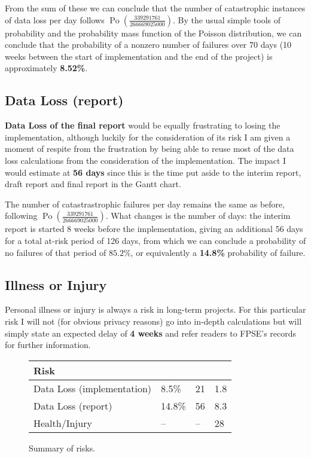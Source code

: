 From the sum of these we can conclude that the number of catastrophic
instances of data loss per day follows $\operatorname{Po}(\frac{339291761}
{266669025000})$. By the usual simple tools of probability and the
probability mass function of the Poisson distribution, we can
conclude that the probability of a nonzero number of failures over
70 days (10 weeks between the start of implementation and the end
of the project) is approximately \textbf{8.52\%}.

\subsection{Data Loss (report)}

\textbf{Data Loss of the final report} would be equally frustrating to
losing the implementation, although luckily for the consideration of its
risk I am given a moment of respite from the frustration by being able to
reuse most of the data loss calculations from the consideration of the
implementation. The impact I would estimate at \textbf{56 days} since this
is the time put aside to the interim report, draft report and final report
in the Gantt chart.

The number of catastrastrophic failures per day remains the same as before,
following $\operatorname{Po}(\frac{339291761}{266669025000})$. What changes
is the number of days: the interim report is started 8 weeks before the
implementation, giving an additional 56 days for a total at-risk period of
126 days, from which we can conclude a probability of no failures of that period
of $85.2\%$, or equivalently a \textbf{14.8\%} probability of failure.

\subsection{Illness or Injury}

Personal illness or injury is always a risk in long-term projects.
For this particular risk I will not (for obvious privacy reasons)
go into in-depth calculations but will simply state an expected
delay of \textbf{4 weeks} and refer readers to FPSE's records for
further information.

\begin{figure}
\begin{tabu} to 0.9\linewidth { X[7,r] | X[c] | X[c] | X[c] }
  \textbf{Risk} &  &
     &  \\
    \hline
    Data Loss (implementation) & 8.5\%
                               & 21
                               & 1.8 \\
    Data Loss (report) & 14.8\%
                       & 56
                       & 8.3 \\
    Health/Injury & --
                  & --
                  & 28
\end{tabu}
\caption{Summary of risks.}
\label{fig:risks}
\end{figure}


